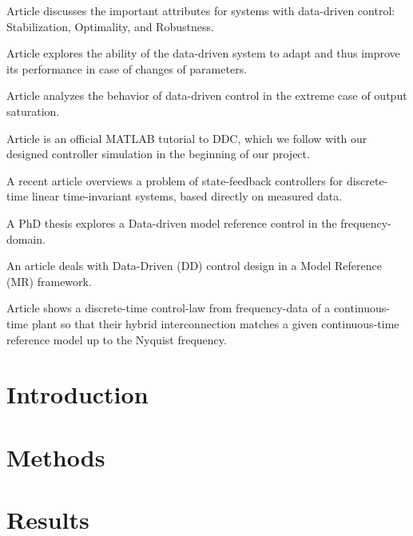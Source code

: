 \documentclass[conference]{IEEEtran}
\begin{document}
Article \cite{de2019a} discusses the important attributes for systems with data-driven control: Stabilization, Optimality, and Robustness.

Article \cite{rosolia2018a} explores the ability of the data-driven system to adapt and thus improve its performance in case of changes of parameters.

Article \cite{bu2018a} analyzes the behavior of data-driven control in the extreme case of output saturation. 

Article \cite{pravallika2021a} is an official MATLAB tutorial to DDC, which we follow with our designed controller simulation in the beginning of our project.

A recent article \cite{Berberich_2020} overviews a problem of state-feedback controllers for discrete-time linear time-invariant systems, based directly on measured data. 

A PhD thesis \cite{kergus} explores a Data-driven model reference control in the frequency-domain. 

An article \cite{CAMPESTRINI20172628} deals with Data-Driven (DD) control design in a Model Reference (MR) framework. 

Article \cite{vuillemin2019hybrid} shows a discrete-time control-law from frequency-data of a continuous-time plant so that their hybrid interconnection matches a given continuous-time reference model up to the Nyquist
frequency. 

\section{Introduction}

\section{Methods}

\section{Results}



\end{document}
